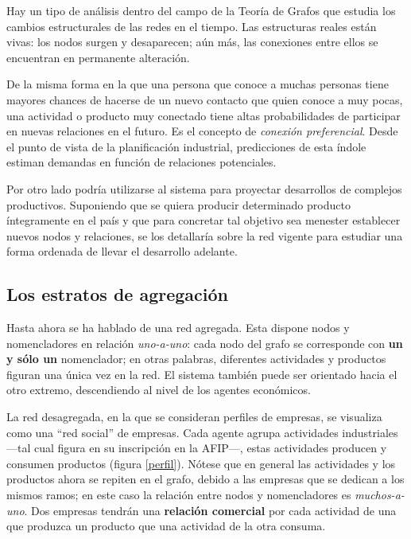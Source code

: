 \documentclass[a4paper]{report}
\begin{document}
Hay un tipo de análisis dentro del campo de la Teoría de Grafos que estudia los cambios estructurales de las redes en el tiempo. Las estructuras reales están vivas: los nodos surgen y desaparecen; aún más, las conexiones entre ellos se encuentran en permanente alteración.

De la misma forma en la que una persona que conoce a muchas personas tiene mayores chances de hacerse de un nuevo contacto que quien conoce a muy pocas, una actividad o producto muy conectado tiene altas probabilidades de participar en nuevas relaciones en el futuro. Es el concepto de \textit{conexión preferencial}. Desde el punto de vista de la planificación industrial, predicciones de esta índole estiman demandas en función de relaciones potenciales.

Por otro lado podría utilizarse al sistema para proyectar desarrollos de complejos productivos. Suponiendo que se quiera producir determinado producto íntegramente en el país y que para concretar tal objetivo sea menester establecer nuevos nodos y relaciones, se los detallaría sobre la red vigente para estudiar una forma ordenada de llevar el desarrollo adelante.

\subsection*{Los estratos de agregación}

Hasta ahora se ha hablado de una red agregada. Esta dispone nodos y nomencladores en relación \textit{uno-a-uno}: cada nodo del grafo se corresponde con \textbf{un y sólo un} nomenclador; en otras palabras, diferentes actividades y productos figuran una única vez en la red. El sistema también puede ser orientado hacia el otro extremo, descendiendo al nivel de los agentes económicos.

La red desagregada, en la que se consideran perfiles de empresas, se visualiza como una ``red social'' de empresas. Cada agente agrupa actividades industriales —tal cual figura en su inscripción en la AFIP—, estas actividades producen y consumen productos (figura \ref{perfil}). Nótese que en general las actividades y los productos ahora se repiten en el grafo, debido a las empresas que se dedican a los mismos ramos; en este caso la relación entre nodos y nomencladores es \textit{muchos-a-uno}. Dos empresas tendrán una \textbf{relación comercial} por cada actividad de una que produzca un producto que una actividad de la otra consuma.
\end{document}
